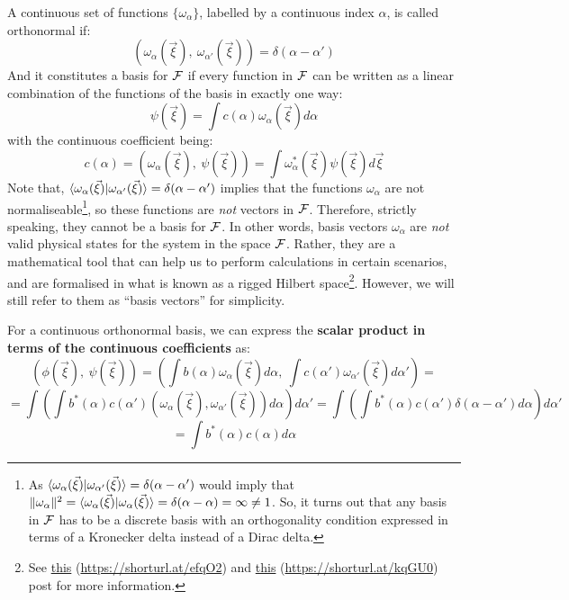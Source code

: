 \begin{definition}
    A continuous set of functions $\{\omega_\alpha\}$, labelled by a continuous index $\alpha$, is called orthonormal if:
    \begin{equation}
        \left(\omega_\alpha(\vec{\xi}), \ \omega_{\alpha'}(\vec{\xi})\right) = \delta(\alpha - \alpha')
    \end{equation}
    And it constitutes a basis for $\mathcal{F}$ if every function in $\mathcal{F}$ can be written as a linear combination of the functions of the basis in exactly one way:
    \begin{equation}
        \psi(\vec{\xi}) = \int c(\alpha) \omega_\alpha(\vec{\xi})d\alpha
    \end{equation}
    with the continuous coefficient being:
    \begin{equation}
        c(\alpha) = \left(\omega_\alpha(\vec{\xi}), \ \psi(\vec{\xi})\right) = \int \omega_\alpha^*(\vec{\xi})\psi(\vec{\xi})d\vec{\xi}
    \end{equation}   
    Note that, $\braket{\omega_\alpha(\vec{\xi})|\omega_{\alpha'}(\vec{\xi})} = \delta(\alpha - \alpha')$ implies that the functions $\omega_\alpha$ are not normaliseable\footnote{As $\braket{\omega_\alpha(\vec{\xi})|\omega_{\alpha'}(\vec{\xi})} = \delta(\alpha - \alpha')$ would imply that $\|\omega_\alpha\|^2 = \braket{\omega_\alpha(\vec{\xi})|\omega_\alpha(\vec{\xi})} = \delta(\alpha - \alpha) = \infty \neq 1$. So, it turns out that any basis in $\mathcal{F}$ has to be a discrete basis with an orthogonality condition expressed in terms of a Kronecker delta instead of a Dirac delta.}, so these functions are \textit{not} vectors in $\mathcal{F}$. Therefore, strictly speaking, they cannot be a basis for $\mathcal{F}$. In other words, basis vectors $\omega_\alpha$ are \textit{not} valid physical states for the system in the space $\mathcal{F}$.  Rather, they are a mathematical tool that can help us to perform calculations in certain scenarios, and are formalised in what is known as a rigged Hilbert space\footnote{See \href{https://physics.stackexchange.com/a/623416/283847}{this} (\underline{https://shorturl.at/efqO2}) and \href{https://physics.stackexchange.com/a/359982/283847}{this} (\underline{https://shorturl.at/kqGU0}) post for more information.}. However, we will still refer to them as ``basis vectors'' for simplicity.
\end{definition}

For a continuous orthonormal basis, we can express the \textbf{scalar product in terms of the continuous coefficients} as:
\begin{equation*}
    \left(\phi(\vec{\xi}), \ \psi(\vec{\xi})\right) = \left(\int b(\alpha) \omega_\alpha(\vec{\xi})d\alpha, \ \int c(\alpha') \omega_{\alpha'}(\vec{\xi})d\alpha'\right) =  
\end{equation*}
\begin{equation*}
    = \int\left(\int b^*(\alpha)c(\alpha') (\omega_\alpha(\vec{\xi}), \omega_{\alpha'}(\vec{\xi}))d\alpha\right) d\alpha' = \int\left(\int b^*(\alpha)c(\alpha') \delta(\alpha-\alpha') d\alpha\right) d\alpha'
\end{equation*}
\begin{equation}
    = \int b^*(\alpha)c(\alpha) d\alpha
\end{equation}

